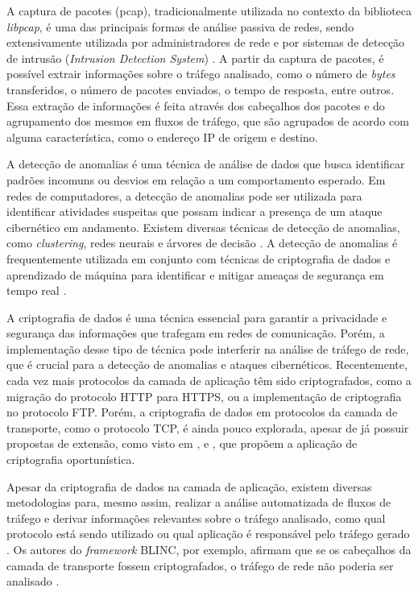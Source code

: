 \documentclass[12pt]{article}
\begin{document}
A captura de pacotes (pcap), tradicionalmente utilizada no contexto da biblioteca \emph{libpcap}, é uma das principais formas de análise passiva de redes, sendo extensivamente utilizada por administradores de rede e por sistemas de detecção de intrusão (\emph{Intrusion Detection System}) \cite{alias2013study}. A partir da captura de pacotes, é possível extrair informações sobre o tráfego analisado, como o número de \emph{bytes} transferidos, o número de pacotes enviados, o tempo de resposta, entre outros. Essa extração de informações é feita através dos cabeçalhos dos pacotes e do agrupamento dos mesmos em fluxos de tráfego, que são agrupados de acordo com alguma característica, como o endereço IP de origem e destino.

A detecção de anomalias é uma técnica de análise de dados que busca identificar padrões incomuns ou desvios em relação a um comportamento esperado. Em redes de computadores, a detecção de anomalias pode ser utilizada para identificar atividades suspeitas que possam indicar a presença de um ataque cibernético em andamento. Existem diversas técnicas de detecção de anomalias, como \emph{clustering}, redes neurais e árvores de decisão \cite{usama2019unsupervised}. A detecção de anomalias é frequentemente utilizada em conjunto com técnicas de criptografia de dados e aprendizado de máquina para identificar e mitigar ameaças de segurança em tempo real \cite{bhuyan2013network}.

A criptografia de dados é uma técnica essencial para garantir a privacidade e segurança das informações que trafegam em redes de comunicação. Porém, a implementação desse tipo de técnica pode interferir na análise de tráfego de rede, que é crucial para a detecção de anomalias e ataques cibernéticos. Recentemente, cada vez mais protocolos da camada de aplicação têm sido criptografados, como a migração do protocolo HTTP para HTTPS, ou a implementação de criptografia no protocolo FTP. Porém, a criptografia de dados em protocolos da camada de transporte, como o protocolo TCP, é ainda pouco explorada, apesar de já possuir propostas de extensão, como visto em \cite{bittau2010case}, \cite{rfc8547} e \cite{rfc8548}, que propõem a aplicação de criptografia oportunística.

Apesar da criptografia de dados na camada de aplicação, existem diversas metodologias para, mesmo assim, realizar a análise automatizada de fluxos de tráfego e derivar informações relevantes sobre o tráfego analisado, como qual protocolo está sendo utilizado ou qual aplicação é responsável pelo tráfego gerado \cite{karagiannis2005blinc}. Os autores do \emph{framework} BLINC, por exemplo, afirmam que se os cabeçalhos da camada de transporte fossem criptografados, o tráfego de rede não poderia ser analisado \cite{boutaba2018comprehensive}.
\end{document}
